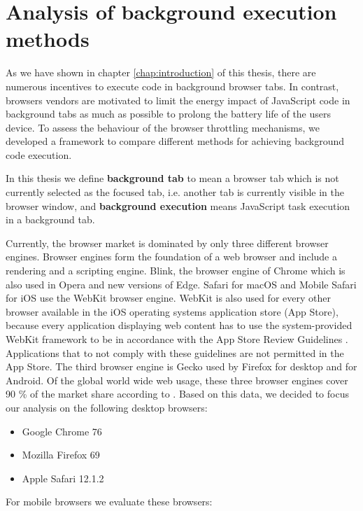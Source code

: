 \documentclass[
	ruledheaders=section,%
	class=report,%
	thesis={type=bachelor},%
	accentcolor=9c,%
	custommargins=true,%
	marginpar=false,%
	parskip=half-,%
	fontsize=11pt,%
]{tudapub}
\begin{document}
  \newpage
  \chapter{Analysis of background execution methods}
  \label{chap:analysis}

  As we have shown in chapter \ref{chap:introduction} of this thesis, there are numerous incentives to execute code in background browser tabs. In contrast, browsers vendors are motivated to limit the energy impact of JavaScript code in background tabs as much as possible to prolong the battery life of the users device. To assess the behaviour of the browser throttling mechanisms, we developed a framework to compare different methods for achieving background code execution.

   In this thesis we define \textbf{background tab} to mean a browser tab which is not currently selected as the focused tab, i.e. another tab is currently visible in the browser window, and \textbf{background execution} means JavaScript task execution in a background tab.

  Currently, the browser market is dominated by only three different browser engines. Browser engines form the foundation of a web browser and include a rendering and a scripting engine. Blink, the browser engine of Chrome which is also used in Opera and new versions of Edge. Safari for macOS and Mobile Safari for iOS use the WebKit browser engine. WebKit is also used for every other browser available in the iOS operating systems application store (App Store), because every application displaying web content has to use the system-provided WebKit framework to be in accordance with the App Store Review Guidelines \cite{apple-app-review-guideline}. Applications that to not comply with these guidelines are not permitted in the App Store. The third browser engine is Gecko used by Firefox for desktop and for Android. Of the global world wide web usage, these three browser engines cover 90 \% of the market share according to \cite{statcounter-global-browser-market-share}. Based on this data, we decided to focus our analysis on the following desktop browsers:

  \begin{itemize}
  \item Google Chrome 76
  \item Mozilla Firefox 69
  \item Apple Safari 12.1.2
  \end{itemize}

  For mobile browsers we evaluate these browsers:
\end{document}
